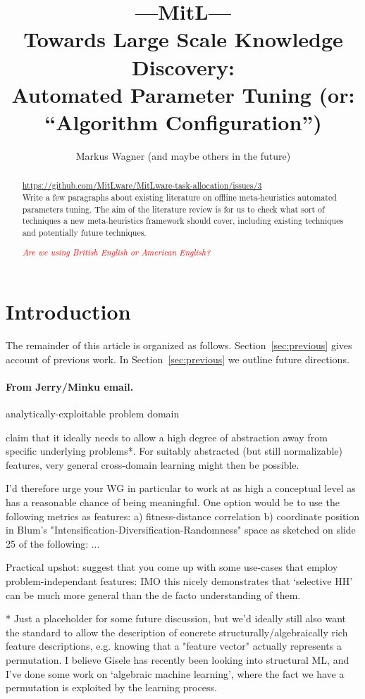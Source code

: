 \documentclass{article}
\title{---MitL---\\Towards Large Scale Knowledge Discovery:\\ Automated Parameter Tuning (or: ``Algorithm Configuration'')}
\author{Markus Wagner (and maybe others in the future)
}
\date{}
\newcommand{\remark}[1]{\textcolor{red}{\em #1}}
\begin{document}
\maketitle

\begin{abstract}
\noindent\url{https://github.com/MitLware/MitLware-task-allocation/issues/3}\\
Write a few paragraphs about existing literature on offline meta-heuristics automated parameters tuning. The aim of the literature review is for us to check what sort of techniques a new meta-heuristics framework should cover, including existing techniques and potentially future techniques.

\remark{Are we using British English or American English?}
\end{abstract}

\section{Introduction}

The remainder of this article is organized as follows.
Section~\ref{sec:previous} gives account of previous work.
In Section~\ref{sec:previous} we outline future directions.


\paragraph{From Jerry/Minku email.}
analytically-exploitable problem domain

claim that it ideally needs
to allow a high degree of abstraction away from specific underlying
problems*. For suitably abstracted (but still normalizable) features,
very general cross-domain learning might then be possible. 

I'd therefore urge your WG in particular to work at as high a conceptual
level as has a reasonable chance of being meaningful. One option would
be to use the following metrics as features: a) fitness-distance
correlation b) coordinate position in Blum's
"Intensification-Diversification-Randomness" space as sketched on slide
25 of the following: ...

Practical upshot: suggest that you come up with some use-cases that
employ problem-independant features: IMO this nicely demonstrates that
`selective HH' can be much more general than the de facto understanding
of them. 

*  Just a placeholder for some future discussion, but we'd ideally still
also want the standard to allow the description of concrete
structurally/algebraically rich feature descriptions, e.g. knowing
that a "feature vector" actually represents a permutation. I believe
Gisele has recently been looking into structural ML, and I've done some
work on `algebraic machine learning', where the fact we have a
permutation is exploited by the learning process. 
\end{document}
